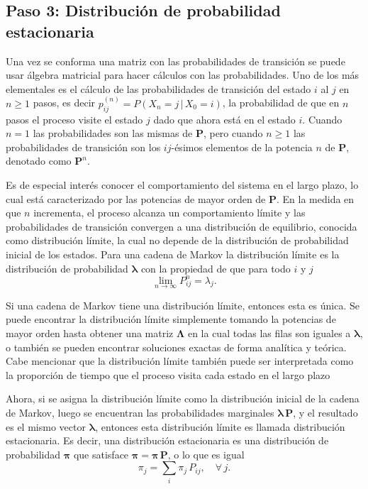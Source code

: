 \subsection*{Paso 3: Distribución de probabilidad estacionaria}
\label{subsec:stationary_distribution}
Una vez se conforma una matriz con las probabilidades de transición se puede usar álgebra matricial para hacer cálculos con las probabilidades.
Uno de los más elementales es el cálculo de las probabilidades de transición del estado $i$ al $j$ en $n \ge 1$ pasos, es decir $p_{ij}^{(n)} = P\left(X_n = j \,|\,X_0 = i\right)$, la probabilidad de que en $n$ pasos el proceso visite el estado $j$ dado que ahora está en el estado $i$.
Cuando $n = 1$ las probabilidades son las mismas de $\mathbf{P}$, pero cuando $n \ge 1$ las probabilidades de transición son los $ij$-ésimos elementos de la potencia $n$ de $\mathbf{P}$, denotado como $\mathbf{P}^n$.

Es de especial interés conocer el comportamiento del sistema en el largo plazo, lo cual está caracterizado por las potencias de mayor orden de $\mathbf{P}$.
En la medida en que $n$ incrementa, el proceso alcanza un comportamiento límite y las probabilidades de transición convergen a una distribución de equilibrio, conocida como distribución límite, la cual no depende de la distribución de probabilidad inicial de los estados.
Para una cadena de Markov la distribución límite es la distribución de probabilidad $\boldsymbol{\lambda}$ con la propiedad de que para todo $i$ y $j$
%
\begin{equation}
    \lim_{n\to\infty} P_{ij}^n = \lambda_{j}.
\end{equation}

Si una cadena de Markov tiene una distribución límite, entonces esta es única.
Se puede encontrar la distribución límite simplemente tomando la potencias de mayor orden hasta obtener una matriz $\boldsymbol{\Lambda}$ en la cual todas las filas son iguales a $\boldsymbol{\lambda}$, o también se pueden encontrar soluciones exactas de forma analítica y teórica.
Cabe mencionar que la distribución límite también puede ser interpretada como la proporción de tiempo que el proceso visita cada estado en el largo plazo

Ahora, si se asigna la distribución límite como la distribución inicial de la cadena de Markov, luego se encuentran las probabilidades marginales $\boldsymbol{\lambda}\,\mathbf{P}$, y el resultado es el mismo vector $\boldsymbol{\lambda}$, entonces esta distribución límite es llamada distribución estacionaria.
Es decir, una distribución estacionaria es una distribución de probabilidad $\boldsymbol{\pi}$ que satisface $\boldsymbol{\pi} = \boldsymbol{\pi}\,\mathbf{P}$, o lo que es igual
%
\begin{equation}
    \label{eq:stationary_distribution}
    \pi_j = \sum_i \pi_j\, P_{ij}, \quad \forall\, j.
\end{equation}

